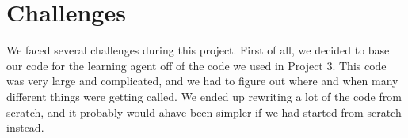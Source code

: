 \documentclass[letterpaper]{article}
\begin{document}



\section{Challenges}
We faced several challenges during this project. First of all, we decided to base our code for the learning agent off of the code we used in Project 3. This code was very large and complicated, and we had to figure out where and when many different things were getting called. We ended up rewriting a lot of the code from scratch, and it probably would ahave been simpler if we had started from scratch instead. \\
\end{document}
